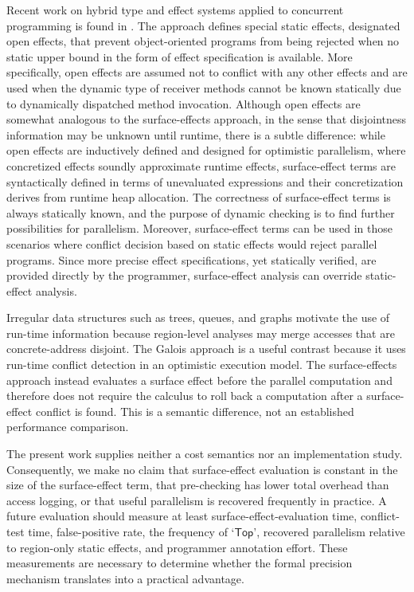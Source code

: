 \documentclass[10pt,a4paper]{article}
\newcommand{\Top}{\mathsf{Top}}
\begin{document}
Recent work on hybrid type and effect systems applied to concurrent
programming is found in \citet{long2013}. The approach defines special static
effects, designated open effects, that prevent object-oriented programs from
being rejected when no static upper bound in the form of effect specification
is available. More specifically, open effects are assumed not to conflict with
any other effects and are used when the dynamic type of receiver methods
cannot be known statically due to dynamically dispatched method invocation.
Although open effects are somewhat analogous to the surface-effects approach,
in the sense that disjointness information may be unknown until runtime,
there is a subtle difference: while open effects are inductively defined and designed for
optimistic parallelism, where concretized effects soundly approximate runtime
effects, surface-effect terms are syntactically defined in terms of unevaluated
expressions and their concretization derives from runtime heap allocation.
The correctness of surface-effect terms is always statically known, and
the purpose of dynamic checking is to find further possibilities for parallelism.
Moreover, surface-effect terms can be used in those scenarios where conflict
decision based on static effects would reject parallel programs. Since more
precise effect specifications, yet statically verified, are provided directly
by the programmer, surface-effect analysis can override static-effect
analysis.

Irregular data structures such as trees, queues, and graphs motivate the use of
run-time information because region-level analyses may merge accesses that are
concrete-address disjoint. The Galois approach \citep{kulkarni2007} is a useful
contrast because it uses run-time conflict detection in an optimistic execution
model. The surface-effects approach instead evaluates a surface effect before the parallel
computation and therefore does not require the calculus to roll back a
computation after a surface-effect conflict is found. This is a semantic
difference, not an established performance comparison.

The present work supplies neither a cost semantics nor an implementation study.
Consequently, we make no claim that surface-effect evaluation is constant in the size
of the surface-effect term, that pre-checking has lower total overhead than access logging,
or that useful parallelism is recovered frequently in practice. A future
evaluation should measure at least surface-effect-evaluation time, conflict-test time,
false-positive rate, the frequency of `$\Top$', recovered parallelism relative
to region-only static effects, and programmer annotation effort. These
measurements are necessary to determine whether the formal precision mechanism
translates into a practical advantage.
\end{document}

